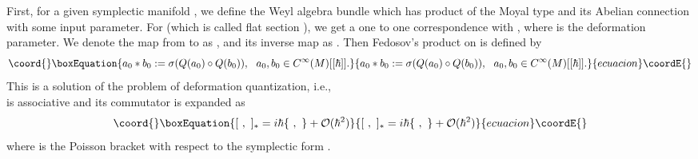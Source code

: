 \documentclass[12pt,a4paper]{article}
\begin{document}
First, for a given symplectic manifold \coordHE{}, we define the Weyl
algebra bundle \coordHE{} which has \myHighlight{$\circ$}\coordHE{} product of the Moyal type and its
Abelian connection \coordHE{} with some input parameter.
For \coordHE{} (which is called flat section \coordHE{}), we get
a one to one correspondence with \coordHE{}, where \myHighlight{$\hbar$}\coordHE{} is the deformation parameter. 
We denote the map from \coordHE{}  to \coordHE{} as \coordHE{}, and its inverse map as \myHighlight{$\sigma$}\coordHE{}.
Then Fedosov's \myHighlight{$*$}\coordHE{} product on \coordHE{} is defined by
\begin{equation}\coord{}\boxEquation{
\label{eqn:STARDF}
a_0*b_0:=\sigma(Q(a_0)\circ Q(b_0)),\ \ a_0,b_0\in C^\infty(M)[[\hbar]].
}{
a_0*b_0:=\sigma(Q(a_0)\circ Q(b_0)),\ \ a_0,b_0\in C^\infty(M)[[\hbar]].
}{ecuacion}\coordE{}\end{equation}
This is a solution of the problem of deformation quantization, i.e.,\\
\myHighlight{$*$}\coordHE{} is associative and its commutator \myHighlight{$[\ ,\ ]_*$}\coordHE{} is expanded as
\begin{equation}\coord{}\boxEquation{
[\ ,\ ]_*=i\hbar \{\ ,\ \}+{\cal O}(\hbar^2)
}{
[\ ,\ ]_*=i\hbar \{\ ,\ \}+{\cal O}(\hbar^2)
}{ecuacion}\coordE{}\end{equation}
where \myHighlight{$\{\ ,\ \}$}\coordHE{} is the Poisson bracket with respect to the symplectic
form \coordHE{}.
\end{document}

